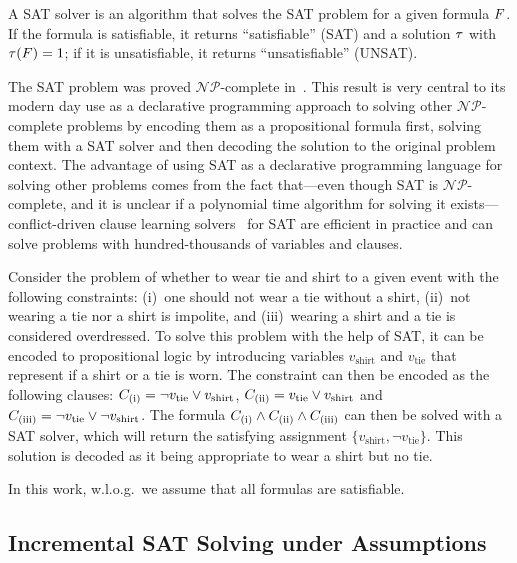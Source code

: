 A SAT solver is an algorithm that solves the SAT problem for a given formula $F$.
If the formula is satisfiable, it returns ``satisfiable'' (SAT) and a solution $\tau$ with $\tau(F)=1$;
if it is unsatisfiable, it returns ``unsatisfiable'' (UNSAT).

The SAT problem was proved $\mathcal{NP}$-complete in~\textcite{DBLP:conf/stoc/Cook71}.
This result is very central to its modern day use as a declarative programming approach to solving other $\mathcal{NP}$-complete problems by encoding them as a propositional formula first, solving them with a SAT solver and then decoding the solution to the original problem context.
The advantage of using SAT as a declarative programming language for solving other problems comes from the fact that---even though SAT is $\mathcal{NP}$-complete, and it is unclear if a polynomial time algorithm for solving it exists---conflict-driven clause learning solvers~\autocite{handbook2-cdcl} for SAT are efficient in practice and can solve problems with hundred-thousands of variables and clauses.

\begin{example}
  Consider the problem of whether to wear tie and shirt to a given event with the following constraints:
  (i)~one should not wear a tie without a shirt, (ii)~not wearing a tie nor a shirt is impolite, and (iii)~wearing a shirt and a tie is considered overdressed.
  To solve this problem with the help of SAT, it can be encoded to propositional logic by introducing variables $v_\text{shirt}$ and $v_\text{tie}$ that represent if a shirt or a tie is worn.
  The constraint can then be encoded as the following clauses:
  $C_\text{(i)} = \lnot v_\text{tie} \lor v_\text{shirt}$, $C_\text{(ii)} = v_\text{tie} \lor v_\text{shirt}$ and $C_\text{(iii)} = \lnot v_\text{tie} \lor \lnot v_\text{shirt}$.
  The formula $C_\text{(i)} \land C_\text{(ii)} \land C_\text{(iii)}$ can then be solved with a SAT solver, which will return the satisfying assignment $\{ v_\text{shirt}, \lnot v_\text{tie} \}$.
  This solution is decoded as it being appropriate to wear a shirt but no tie.
\end{example}

In this work, w.l.o.g.\ we assume that all formulas are satisfiable.

\subsection{Incremental SAT Solving under Assumptions\label{sec:inc-sat}}

